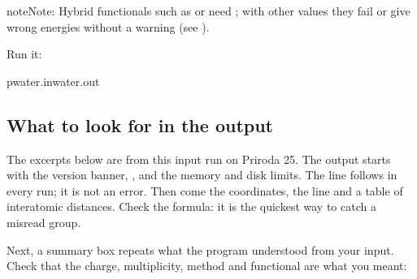 \documentclass[letterpaper,10pt,english,openany,oneside]{sphinxmanual}
\begin{document}
\begin{sphinxadmonition}{note}{Note:}
\sphinxAtStartPar
Hybrid functionals such as  or  need {\hyperref[\detokenize{reference/control:control-theory}]{}}; with other  values
they fail or give wrong energies without a warning (see {\hyperref[\detokenize{troubleshooting/common-problems:troubleshooting-hybrid}]{}}).


\end{sphinxadmonition}

\sphinxAtStartPar
Run it:

\begin{sphinxVerbatim}[commandchars=\\\{\}]
pwater.inwater.out
\end{sphinxVerbatim}


\subsection{What to look for in the output}
\label{\detokenize{start/getting-started:what-to-look-for-in-the-output}}
\sphinxAtStartPar
The excerpts below are from this input run on Priroda 25. The output starts with the version banner,
, and the memory and disk limits. The line  follows in every run; it is
not an error. Then come the coordinates, the  line and a table of interatomic distances. Check the
formula: it is the quickest way to catch a misread  group.



\sphinxAtStartPar
Next, a summary box repeats what the program understood from your input. Check that the charge, multiplicity,
method and functional are what you meant:
\end{document}
